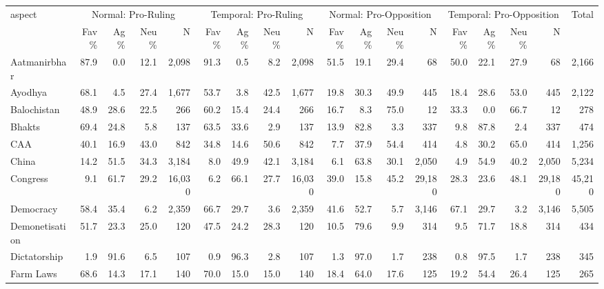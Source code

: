 \begin{table}[htbp]
\centering
\scriptsize
\setlength{\tabcolsep}{2.2pt}
\begin{adjustbox}{max width=\textwidth}
\begin{tabular}{lrrrrrrrrrrrrrrrrr}
\toprule
\multirow{2}{*}{aspect} & \multicolumn{4}{c}{Normal: Pro-Ruling} & \multicolumn{4}{c}{Temporal: Pro-Ruling} & \multicolumn{4}{c}{Normal: Pro-Opposition} & \multicolumn{4}{c}{Temporal: Pro-Opposition} & \multirow{2}{*}{Total} \\
\cmidrule(lr){2-5}\cmidrule(lr){6-9}\cmidrule(lr){10-13}\cmidrule(lr){14-17}
& Fav\% & Ag\% & Neu\% & N & Fav\% & Ag\% & Neu\% & N & Fav\% & Ag\% & Neu\% & N & Fav\% & Ag\% & Neu\% & N & \\
\midrule
Aatmanirbhar & 87.9 & 0.0 & 12.1 & 2,098 & 91.3 & 0.5 & 8.2 & 2,098 & 51.5 & 19.1 & 29.4 & 68 & 50.0 & 22.1 & 27.9 & 68 & 2,166 \\
Ayodhya & 68.1 & 4.5 & 27.4 & 1,677 & 53.7 & 3.8 & 42.5 & 1,677 & 19.8 & 30.3 & 49.9 & 445 & 18.4 & 28.6 & 53.0 & 445 & 2,122 \\
Balochistan & 48.9 & 28.6 & 22.5 & 266 & 60.2 & 15.4 & 24.4 & 266 & 16.7 & 8.3 & 75.0 & 12 & 33.3 & 0.0 & 66.7 & 12 & 278 \\
Bhakts & 69.4 & 24.8 & 5.8 & 137 & 63.5 & 33.6 & 2.9 & 137 & 13.9 & 82.8 & 3.3 & 337 & 9.8 & 87.8 & 2.4 & 337 & 474 \\
CAA & 40.1 & 16.9 & 43.0 & 842 & 34.8 & 14.6 & 50.6 & 842 & 7.7 & 37.9 & 54.4 & 414 & 4.8 & 30.2 & 65.0 & 414 & 1,256 \\
China & 14.2 & 51.5 & 34.3 & 3,184 & 8.0 & 49.9 & 42.1 & 3,184 & 6.1 & 63.8 & 30.1 & 2,050 & 4.9 & 54.9 & 40.2 & 2,050 & 5,234 \\
Congress & 9.1 & 61.7 & 29.2 & 16,030 & 6.2 & 66.1 & 27.7 & 16,030 & 39.0 & 15.8 & 45.2 & 29,180 & 28.3 & 23.6 & 48.1 & 29,180 & 45,210 \\
Democracy & 58.4 & 35.4 & 6.2 & 2,359 & 66.7 & 29.7 & 3.6 & 2,359 & 41.6 & 52.7 & 5.7 & 3,146 & 67.1 & 29.7 & 3.2 & 3,146 & 5,505 \\
Demonetisation & 51.7 & 23.3 & 25.0 & 120 & 47.5 & 24.2 & 28.3 & 120 & 10.5 & 79.6 & 9.9 & 314 & 9.5 & 71.7 & 18.8 & 314 & 434 \\
Dictatorship & 1.9 & 91.6 & 6.5 & 107 & 0.9 & 96.3 & 2.8 & 107 & 1.3 & 97.0 & 1.7 & 238 & 0.8 & 97.5 & 1.7 & 238 & 345 \\
Farm Laws & 68.6 & 14.3 & 17.1 & 140 & 70.0 & 15.0 & 15.0 & 140 & 18.4 & 64.0 & 17.6 & 125 & 19.2 & 54.4 & 26.4 & 125 & 265 \\

\end{tabular}
\end{adjustbox}
\end{table}
